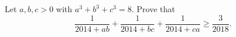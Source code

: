 Let $a,b,c>0$ with $a^3+b^3+c^3=8$. Prove that
\[\dfrac{1}{2014+ab}+\dfrac{1}{2014+bc}+\dfrac{1}{2014+ca}\ge\dfrac{3}{2018}.\]
